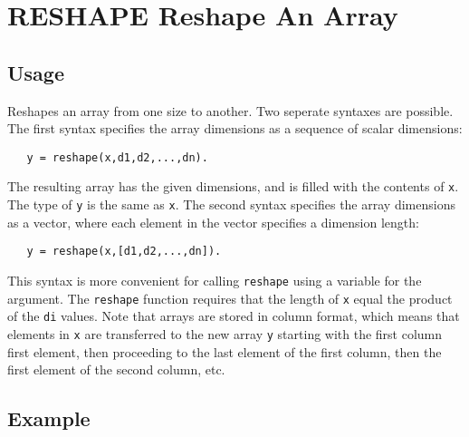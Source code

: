 \section{RESHAPE Reshape An Array}

\subsection{Usage}

Reshapes an array from one size to another. Two seperate 
syntaxes are possible.  The first syntax specifies the array 
dimensions as a sequence of scalar dimensions:
\begin{verbatim}
   y = reshape(x,d1,d2,...,dn).
\end{verbatim}
The resulting array has the given dimensions, and is filled with
the contents of \verb|x|.  The type of \verb|y| is the same as \verb|x|.  
The second syntax specifies the array dimensions as a vector,
where each element in the vector specifies a dimension length:
\begin{verbatim}
   y = reshape(x,[d1,d2,...,dn]).
\end{verbatim}
This syntax is more convenient for calling \verb|reshape| using a 
variable for the argument. The
\verb|reshape| function requires that the length of \verb|x| equal the product
of the \verb|di| values.
Note that arrays are stored in column format, 
which means that elements in \verb|x| are transferred to the new array
\verb|y| starting with the first column first element, then proceeding to 
the last element of the first column, then the first element of the
second column, etc.
\subsection{Example}

